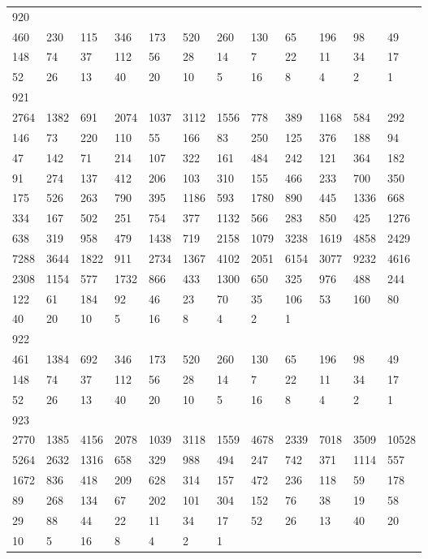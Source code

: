 \begin{longtable}{llllllllllll}
920&&&&&&&&&&&\\
460& 230& 115& 346& 173& 520& 260& 130& 65& 196& 98& 49\\
148& 74& 37& 112& 56& 28& 14& 7& 22& 11& 34& 17\\
52& 26& 13& 40& 20& 10& 5& 16& 8& 4& 2& 1\\

921&&&&&&&&&&&\\
2764& 1382& 691& 2074& 1037& 3112& 1556& 778& 389& 1168& 584& 292\\
146& 73& 220& 110& 55& 166& 83& 250& 125& 376& 188& 94\\
47& 142& 71& 214& 107& 322& 161& 484& 242& 121& 364& 182\\
91& 274& 137& 412& 206& 103& 310& 155& 466& 233& 700& 350\\
175& 526& 263& 790& 395& 1186& 593& 1780& 890& 445& 1336& 668\\
334& 167& 502& 251& 754& 377& 1132& 566& 283& 850& 425& 1276\\
638& 319& 958& 479& 1438& 719& 2158& 1079& 3238& 1619& 4858& 2429\\
7288& 3644& 1822& 911& 2734& 1367& 4102& 2051& 6154& 3077& 9232& 4616\\
2308& 1154& 577& 1732& 866& 433& 1300& 650& 325& 976& 488& 244\\
122& 61& 184& 92& 46& 23& 70& 35& 106& 53& 160& 80\\
40& 20& 10& 5& 16& 8& 4& 2& 1& \\

922&&&&&&&&&&&\\
461& 1384& 692& 346& 173& 520& 260& 130& 65& 196& 98& 49\\
148& 74& 37& 112& 56& 28& 14& 7& 22& 11& 34& 17\\
52& 26& 13& 40& 20& 10& 5& 16& 8& 4& 2& 1\\

923&&&&&&&&&&&\\
2770& 1385& 4156& 2078& 1039& 3118& 1559& 4678& 2339& 7018& 3509& 10528\\
5264& 2632& 1316& 658& 329& 988& 494& 247& 742& 371& 1114& 557\\
1672& 836& 418& 209& 628& 314& 157& 472& 236& 118& 59& 178\\
89& 268& 134& 67& 202& 101& 304& 152& 76& 38& 19& 58\\
29& 88& 44& 22& 11& 34& 17& 52& 26& 13& 40& 20\\
10& 5& 16& 8& 4& 2& 1& \\


\end{longtable}
